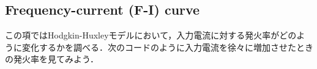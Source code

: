 \subsection{Frequency-current (F-I) curve}
この項ではHodgkin-Huxleyモデルにおいて，入力電流に対する発火率がどのように変化するかを調べる．次のコードのように入力電流を徐々に増加させたときの発火率を見てみよう．
